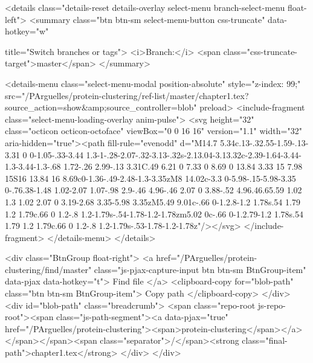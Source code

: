 <details class="details-reset details-overlay select-menu branch-select-menu float-left">
  <summary class="btn btn-sm select-menu-button css-truncate"
           data-hotkey="w"
           
           title="Switch branches or tags">
    <i>Branch:</i>
    <span class="css-truncate-target">master</span>
  </summary>

  <details-menu class="select-menu-modal position-absolute" style="z-index: 99;" src="/PArguelles/protein-clustering/ref-list/master/chapter1.tex?source_action=show&amp;source_controller=blob" preload>
    <include-fragment class="select-menu-loading-overlay anim-pulse">
      <svg height="32" class="octicon octicon-octoface" viewBox="0 0 16 16" version="1.1" width="32" aria-hidden="true"><path fill-rule="evenodd" d="M14.7 5.34c.13-.32.55-1.59-.13-3.31 0 0-1.05-.33-3.44 1.3-1-.28-2.07-.32-3.13-.32s-2.13.04-3.13.32c-2.39-1.64-3.44-1.3-3.44-1.3-.68 1.72-.26 2.99-.13 3.31C.49 6.21 0 7.33 0 8.69 0 13.84 3.33 15 7.98 15S16 13.84 16 8.69c0-1.36-.49-2.48-1.3-3.35zM8 14.02c-3.3 0-5.98-.15-5.98-3.35 0-.76.38-1.48 1.02-2.07 1.07-.98 2.9-.46 4.96-.46 2.07 0 3.88-.52 4.96.46.65.59 1.02 1.3 1.02 2.07 0 3.19-2.68 3.35-5.98 3.35zM5.49 9.01c-.66 0-1.2.8-1.2 1.78s.54 1.79 1.2 1.79c.66 0 1.2-.8 1.2-1.79s-.54-1.78-1.2-1.78zm5.02 0c-.66 0-1.2.79-1.2 1.78s.54 1.79 1.2 1.79c.66 0 1.2-.8 1.2-1.79s-.53-1.78-1.2-1.78z"/></svg>
    </include-fragment>
  </details-menu>
</details>

      <div class="BtnGroup float-right">
        <a href="/PArguelles/protein-clustering/find/master"
              class="js-pjax-capture-input btn btn-sm BtnGroup-item"
              data-pjax
              data-hotkey="t">
          Find file
        </a>
        <clipboard-copy for="blob-path" class="btn btn-sm BtnGroup-item">
          Copy path
        </clipboard-copy>
      </div>
      <div id="blob-path" class="breadcrumb">
        <span class="repo-root js-repo-root"><span class="js-path-segment"><a data-pjax="true" href="/PArguelles/protein-clustering"><span>protein-clustering</span></a></span></span><span class="separator">/</span><strong class="final-path">chapter1.tex</strong>
      </div>
    </div>



